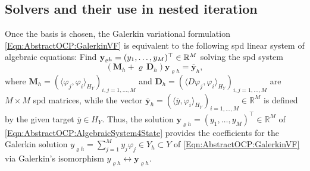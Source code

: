 \documentclass{article}
\numberwithin{equation}{section}
\begin{document}
\subsection{Solvers and their use in nested iteration}
\label{Subsection:AbstractOCP:Solver}
Once the basis is chosen, the Galerkin variational formulation
\eqref{Eqn:AbstractOCP:GalerkinVF} is equivalent to the following 
spd
linear system of algebraic equations: Find
${\bf y}_{\varrho h} = (y_1,\ldots,y_M)^\top \in \mathbb{R}^M$ solving the spd
system
\begin{equation}\label{Eqn:AbstractOCP:AlgebraicSystem4State}
  ({\mathbf M}_h + \varrho \, {\mathbf D}_h) {\mathbf y}_{\varrho h} =
  \overline{\mathbf y}_h,
\end{equation}
where
${\mathbf M}_h = (\langle \varphi_j , \varphi_i \rangle_{H_Y})_{i,j=1,\ldots,M}$
and 
${\mathbf D}_h = (\langle D \varphi_j , \varphi_i \rangle_{H_Y})_{i,j=1,\ldots,M}$ 
are $M \times M$ spd matrices, while the vector 
${\mathbf \overline{y}}_h =(\langle  \overline{y}, \varphi_i
\rangle_{H_Y})_{i=1,\ldots,M} \in \mathbb{R}^M $ is defined by the given target
$\overline{y} \in H_Y$. Thus, the solution
${\mathbf y}_{\varrho h} = (y_1,\ldots,y_M)^\top \in \mathbb{R}^M$ of
\eqref{Eqn:AbstractOCP:AlgebraicSystem4State} provides the coefficients for
the Galerkin solution 
$y_{\varrho h} = \sum_{j=1}^M y_j \varphi_j \in Y_h \subset Y$ of
\eqref{Eqn:AbstractOCP:GalerkinVF} via Galerkin's isomorphism
$y_{\varrho h} \leftrightarrow {\mathbf y}_{\varrho h}$.
\end{document}
